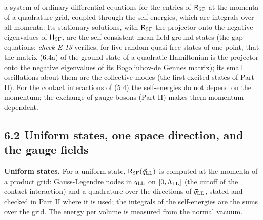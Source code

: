 \documentclass[
  10pt,
]{article}
\begin{document}
a system of ordinary differential equations for the entries of
\(\mathsf R_{\rm SF}\) at the momenta of a quadrature grid, coupled
through the self-energies, which are integrals over all momenta. Its
stationary solutions, with \(\mathsf R_{\rm SF}\) the projector onto the
negative eigenvalues of \(\mathsf H_{\rm SF}\), are the self-consistent
mean-field ground states (the gap equations; \emph{check E-13} verifies,
for five random quasi-free states of one point, that the matrix (6.4a)
of the ground state of a quadratic Hamiltonian is the projector onto the
negative eigenvalues of its Bogoliubov-de Gennes matrix); its small
oscillations about them are the collective modes (the first excited
states of Part II). For the contact interactions of (5.4) the
self-energies do not depend on the momentum; the exchange of gauge
bosons (Part II) makes them momentum-dependent.

\hypertarget{uniform-states-one-space-direction-and-the-gauge-fields}{%
\subsection{6.2 Uniform states, one space direction, and the gauge
fields}\label{uniform-states-one-space-direction-and-the-gauge-fields}}

\textbf{Uniform states.} For a uniform state,
\(\mathsf R_{\rm SF}(\vec q_{\rm LL})\) is computed at the momenta of a
product grid: Gauss-Legendre nodes in \(q_{\rm LL}\) on
\([0,\Lambda_{\rm LL}]\) (the cutoff of the contact interaction) and a
quadrature over the directions of \(\vec q_{\rm LL}\), stated and
checked in Part II where it is used; the integrals of the self-energies
are the sums over the grid. The energy per volume is measured from the
normal vacuum.
\end{document}
